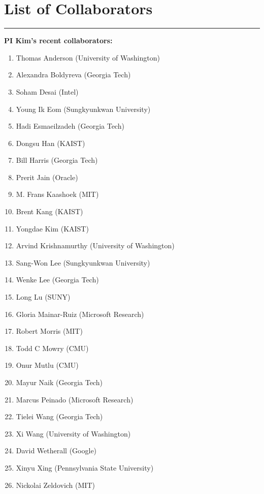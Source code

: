  
\section*{List of Collaborators}
\vskip-0.15in\rule{6.5in}{0.0005in}

\vspace{0.1in}

\noindent


\noindent \textbf{PI Kim's recent collaborators:}
\begin{enumerate}
\item Thomas Anderson (University of Washington)
\item Alexandra Boldyreva (Georgia Tech)
\item Soham Desai (Intel)
\item Young Ik Eom (Sungkyunkwan University)
\item Hadi Esmaeilzadeh (Georgia Tech)
\item Dongsu Han (KAIST)
\item Bill Harris (Georgia Tech)
\item Prerit Jain (Oracle)
\item M. Frans Kaashoek (MIT)
\item Brent Kang (KAIST)
\item Yongdae Kim (KAIST)
\item Arvind Krishnamurthy (University of Washington)
\item Sang-Won Lee (Sungkyunkwan University)
\item Wenke Lee (Georgia Tech)
\item Long Lu (SUNY)
\item Gloria Mainar-Ruiz (Microsoft Research)
\item Robert Morris (MIT)
\item Todd C Mowry (CMU)
\item Onur Mutlu (CMU)
\item Mayur Naik (Georgia Tech)
\item Marcus Peinado (Microsoft Research)
\item Tielei Wang (Georgia Tech)
\item Xi Wang (University of Washington)
\item David Wetherall (Google)
\item Xinyu Xing (Pennsylvania State University)
\item Nickolai Zeldovich (MIT)
\end{enumerate}
 

